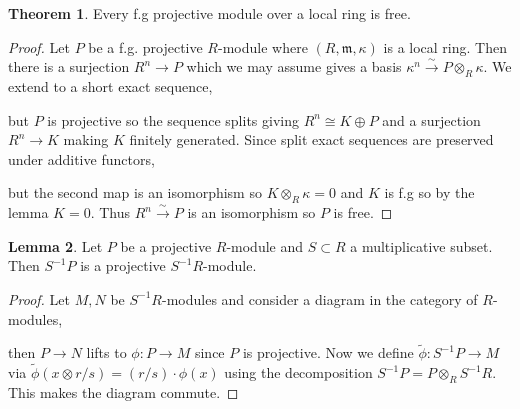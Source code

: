 \documentclass[12pt]{extarticle}
\theoremstyle{definition}
\newtheorem{theorem}{Theorem}[section]
\newtheorem{lemma}[theorem]{Lemma}
\newcommand{\m}{\mathfrak{m}}
\begin{document}
\begin{theorem}
Every f.g projective module over a local ring is free.
\end{theorem}

\begin{proof}
Let $P$ be a f.g. projective $R$-module where $(R, \m, \kappa)$ is a local ring. Then there is a surjection $R^n \to P$ which we may assume gives a basis $\kappa^n \xrightarrow{\sim} P \otimes_R \kappa$. We extend to a short exact sequence,
\begin{center}
\end{center}
but $P$ is projective so the sequence splits giving $R^n \cong K \oplus P$ and a surjection $R^n \to K$ making $K$ finitely generated. Since split exact sequences are preserved under additive functors,
\begin{center}
\end{center}
but the second map is an isomorphism so $K \otimes_R \kappa = 0$ and $K$ is f.g so by the lemma $K = 0$. Thus $R^n \xrightarrow{\sim} P$ is an isomorphism so $P$ is free.
\end{proof}

\begin{lemma}
Let $P$ be a projective $R$-module and $S \subset R$ a multiplicative subset. Then $S^{-1} P$ is a projective $S^{-1} R$-module.
\end{lemma}

\begin{proof}
Let $M, N$ be $S^{-1} R$-modules and consider a diagram in the category of $R$-modules,
\begin{center}
\end{center}
then $P \to N$ lifts to $\phi : P \to M$ since $P$ is projective. Now we define $\tilde{\phi} : S^{-1} P \to M$ via $\tilde{\phi}(x \otimes r/s) = (r/s) \cdot \phi(x)$ using the decomposition $S^{-1} P = P \otimes_R S^{-1} R$. This makes the diagram commute. 
\end{proof}
\end{document}
